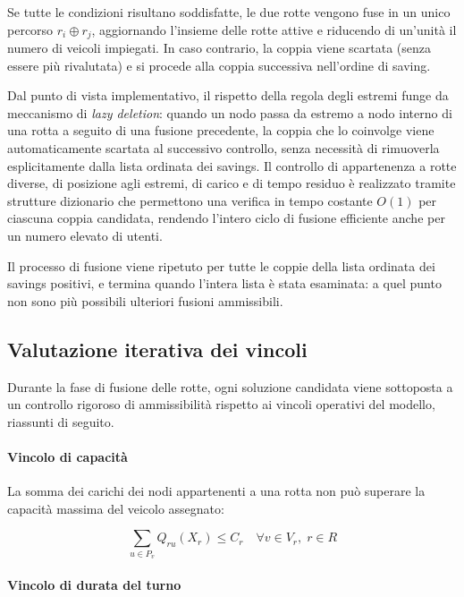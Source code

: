 Se tutte le condizioni risultano soddisfatte, le due rotte vengono fuse in un unico percorso $r_i \oplus r_j$, aggiornando l'insieme delle rotte attive e riducendo di un'unità il numero di veicoli impiegati. In caso contrario, la coppia viene scartata (senza essere più rivalutata) e si procede alla coppia successiva nell'ordine di saving.

Dal punto di vista implementativo, il rispetto della regola degli estremi funge da meccanismo di \emph{lazy deletion}: quando un nodo passa da estremo a nodo interno di una rotta a seguito di una fusione precedente, la coppia che lo coinvolge viene automaticamente scartata al successivo controllo, senza necessità di rimuoverla esplicitamente dalla lista ordinata dei savings. Il controllo di appartenenza a rotte diverse, di posizione agli estremi, di carico e di tempo residuo è realizzato tramite strutture dizionario che permettono una verifica in tempo costante $O(1)$ per ciascuna coppia candidata, rendendo l'intero ciclo di fusione efficiente anche per un numero elevato di utenti.

Il processo di fusione viene ripetuto per tutte le coppie della lista ordinata dei savings positivi, e termina quando l'intera lista è stata esaminata: a quel punto non sono più possibili ulteriori fusioni ammissibili.

\subsection{Valutazione iterativa dei vincoli}

Durante la fase di fusione delle rotte, ogni soluzione candidata viene sottoposta a un controllo rigoroso di ammissibilità rispetto ai vincoli operativi del modello, riassunti di seguito.

\paragraph{Vincolo di capacità}

La somma dei carichi dei nodi appartenenti a una rotta non può superare la capacità massima del veicolo assegnato:

\[
\sum_{u \in P_v} Q_{ru}(X_r) \leq C_r \quad \forall v \in V_r, \; r \in R
\]

\paragraph{Vincolo di durata del turno}

